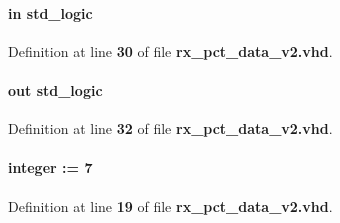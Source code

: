 \paragraph[{infifo\+\_\+empty}]{ {\bfseries \textcolor{keywordflow}{in}\textcolor{vhdlchar}{ }} {\bfseries \textcolor{comment}{std\+\_\+logic}\textcolor{vhdlchar}{ }} \hspace{0.3cm}{\ttfamily [Port]}}\label{classrx__pct__data__v2_a3de861a34ca7fc77684a376b2ea7d898}


Definition at line {\bf 30} of file {\bf rx\+\_\+pct\+\_\+data\+\_\+v2.\+vhd}.

\paragraph[{infifo\+\_\+rd}]{ {\bfseries \textcolor{keywordflow}{out}\textcolor{vhdlchar}{ }} {\bfseries \textcolor{comment}{std\+\_\+logic}\textcolor{vhdlchar}{ }} \hspace{0.3cm}{\ttfamily [Port]}}\label{classrx__pct__data__v2_ae5309ccc8bd3a300879eab2d1430d27a}


Definition at line {\bf 32} of file {\bf rx\+\_\+pct\+\_\+data\+\_\+v2.\+vhd}.

\paragraph[{infifo\+\_\+rdsize}]{ {\bfseries \textcolor{vhdlchar}{ }} {\bfseries \textcolor{comment}{integer}\textcolor{vhdlchar}{ }\textcolor{vhdlchar}{ }\textcolor{vhdlchar}{\+:}\textcolor{vhdlchar}{=}\textcolor{vhdlchar}{ }\textcolor{vhdlchar}{ } \textcolor{vhdldigit}{7} \textcolor{vhdlchar}{ }} \hspace{0.3cm}{\ttfamily [Generic]}}\label{classrx__pct__data__v2_a174e66c48d4776bee8c3ed7303e7eaf1}


Definition at line {\bf 19} of file {\bf rx\+\_\+pct\+\_\+data\+\_\+v2.\+vhd}.


